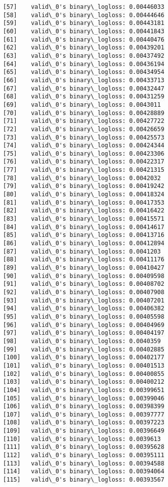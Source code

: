 \documentclass[11pt]{article}
\begin{document}
\begin{Verbatim}[commandchars=\\\{\}]
[57]	valid\_0's binary\_logloss: 0.00446033
[58]	valid\_0's binary\_logloss: 0.00444646
[59]	valid\_0's binary\_logloss: 0.00443181
[60]	valid\_0's binary\_logloss: 0.00441843
[61]	valid\_0's binary\_logloss: 0.00440476
[62]	valid\_0's binary\_logloss: 0.00439201
[63]	valid\_0's binary\_logloss: 0.00437492
[64]	valid\_0's binary\_logloss: 0.00436194
[65]	valid\_0's binary\_logloss: 0.00434954
[66]	valid\_0's binary\_logloss: 0.00433713
[67]	valid\_0's binary\_logloss: 0.00432447
[68]	valid\_0's binary\_logloss: 0.00431259
[69]	valid\_0's binary\_logloss: 0.0043011
[70]	valid\_0's binary\_logloss: 0.00428889
[71]	valid\_0's binary\_logloss: 0.00427722
[72]	valid\_0's binary\_logloss: 0.00426659
[73]	valid\_0's binary\_logloss: 0.00425573
[74]	valid\_0's binary\_logloss: 0.00424344
[75]	valid\_0's binary\_logloss: 0.00423306
[76]	valid\_0's binary\_logloss: 0.00422317
[77]	valid\_0's binary\_logloss: 0.00421315
[78]	valid\_0's binary\_logloss: 0.0042032
[79]	valid\_0's binary\_logloss: 0.00419242
[80]	valid\_0's binary\_logloss: 0.00418324
[81]	valid\_0's binary\_logloss: 0.00417353
[82]	valid\_0's binary\_logloss: 0.00416422
[83]	valid\_0's binary\_logloss: 0.00415571
[84]	valid\_0's binary\_logloss: 0.00414617
[85]	valid\_0's binary\_logloss: 0.00413716
[86]	valid\_0's binary\_logloss: 0.00412894
[87]	valid\_0's binary\_logloss: 0.0041203
[88]	valid\_0's binary\_logloss: 0.00411176
[89]	valid\_0's binary\_logloss: 0.00410427
[90]	valid\_0's binary\_logloss: 0.00409598
[91]	valid\_0's binary\_logloss: 0.00408702
[92]	valid\_0's binary\_logloss: 0.00407908
[93]	valid\_0's binary\_logloss: 0.00407201
[94]	valid\_0's binary\_logloss: 0.00406382
[95]	valid\_0's binary\_logloss: 0.00405598
[96]	valid\_0's binary\_logloss: 0.00404969
[97]	valid\_0's binary\_logloss: 0.00404197
[98]	valid\_0's binary\_logloss: 0.0040359
[99]	valid\_0's binary\_logloss: 0.00402885
[100]	valid\_0's binary\_logloss: 0.00402177
[101]	valid\_0's binary\_logloss: 0.00401513
[102]	valid\_0's binary\_logloss: 0.00400855
[103]	valid\_0's binary\_logloss: 0.00400212
[104]	valid\_0's binary\_logloss: 0.00399651
[105]	valid\_0's binary\_logloss: 0.00399046
[106]	valid\_0's binary\_logloss: 0.00398399
[107]	valid\_0's binary\_logloss: 0.00397777
[108]	valid\_0's binary\_logloss: 0.00397223
[109]	valid\_0's binary\_logloss: 0.00396649
[110]	valid\_0's binary\_logloss: 0.0039613
[111]	valid\_0's binary\_logloss: 0.00395628
[112]	valid\_0's binary\_logloss: 0.00395111
[113]	valid\_0's binary\_logloss: 0.00394588
[114]	valid\_0's binary\_logloss: 0.00394064
[115]	valid\_0's binary\_logloss: 0.00393567

\end{Verbatim}
\end{document}
